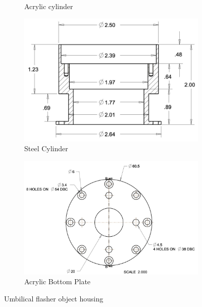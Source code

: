 \documentclass[12pt]{article}
\begin{document}
\begin{figure}
\begin{center}
\begin{subfigure}{0.4\textwidth}
    \caption{Acrylic cylinder}
   \end{subfigure}
  \begin{subfigure}{0.4\textwidth}
    \includegraphics[width=\textwidth]{UFOSteelCylinder}
    \caption{Steel Cylinder}
  \end{subfigure}
  \begin{subfigure}{0.4\textwidth}
    \includegraphics[width=\textwidth]{UFOBottomPlate}
    \caption{Acrylic Bottom Plate}
  \end{subfigure}
  \caption{Umbilical flasher object housing}
  \label{fig:UFO}
  \end{center}
\end{figure}
\end{document}
